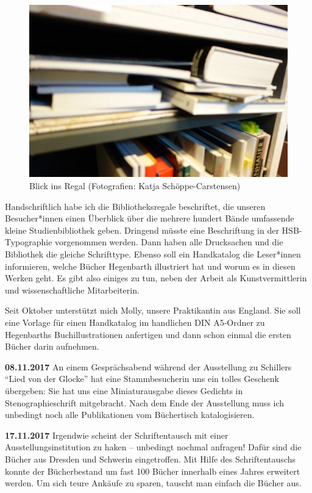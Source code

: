 \documentclass[a4paper,
fontsize=11pt,
oneside,
numbers=noperiodatend,
parskip=half-,
bibliography=totoc,
final
]{scrartcl}
\begin{document}
\begin{figure}
\centering
\includegraphics{img/Schoeppe_4.jpg}
\caption{Blick ins Regal (Fotografien: Katja Schöppe-Carstensen)}
\end{figure}

Handschriftlich habe ich die Bibliotheksregale beschriftet, die unseren
Besucher*innen einen Überblick über die mehrere hundert Bände umfassende
kleine Studienbibliothek geben. Dringend müsste eine Beschriftung in der
HSB-Typographie vorgenommen werden. Dann haben alle Drucksachen und die
Bibliothek die gleiche Schrifttype. Ebenso soll ein Handkatalog die
Leser*innen informieren, welche Bücher Hegenbarth illustriert hat und
worum es in diesen Werken geht. Es gibt also einiges zu tun, neben der
Arbeit als Kunstvermittlerin und wissenschaftliche Mitarbeiterin.

Seit Oktober unterstützt mich Molly, unsere Praktikantin aus England.
Sie soll eine Vorlage für einen Handkatalog im handlichen DIN A5-Ordner
zu Hegenbarths Buchillustrationen anfertigen und dann schon einmal die
ersten Bücher darin aufnehmen.

\textbf{08.11.2017} An einem Gesprächsabend während der Ausstellung zu
Schillers \enquote{Lied von der Glocke} hat eine Stammbesucherin uns ein
tolles Geschenk übergeben: Sie hat uns eine Miniaturausgabe dieses
Gedichts in Stenographieschrift mitgebracht. Nach dem Ende der
Ausstellung muss ich unbedingt noch alle Publikationen vom Büchertisch
katalogisieren.

\textbf{17.11.2017} Irgendwie scheint der Schriftentausch mit einer
Ausstellungsinstitution zu haken -- unbedingt nochmal anfragen! Dafür
sind die Bücher aus Dresden und Schwerin eingetroffen. Mit Hilfe des
Schriftentauschs konnte der Bücherbestand um fast 100 Bücher innerhalb
eines Jahres erweitert werden. Um sich teure Ankäufe zu sparen, tauscht
man einfach die Bücher aus.
\end{document}
